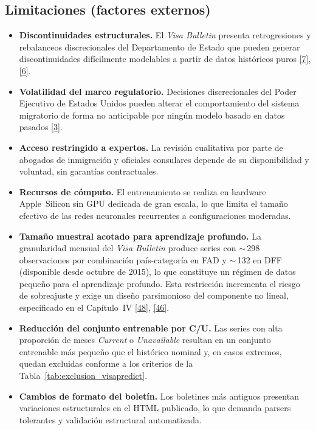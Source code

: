 \documentclass[12pt,letterpaper]{report}
\newcommand{\cita}[1]{\hyperref[bib:#1]{[#1]}}
\begin{document}
\subsection*{Limitaciones (factores externos)}

\begin{itemize}[leftmargin=1.4cm, itemsep=2pt, topsep=2pt]
    \item \textbf{Discontinuidades estructurales.} El \textit{Visa Bulletin} presenta retrogresiones y rebalanceos discrecionales del Departamento de Estado que pueden generar discontinuidades difícilmente modelables a partir de datos históricos puros \cita{7}, \cita{6}.
    \item \textbf{Volatilidad del marco regulatorio.} Decisiones discrecionales del Poder Ejecutivo de Estados Unidos pueden alterar el comportamiento del sistema migratorio de forma no anticipable por ningún modelo basado en datos pasados \cita{3}.
    \item \textbf{Acceso restringido a expertos.} La revisión cualitativa por parte de abogados de inmigración y oficiales consulares depende de su disponibilidad y voluntad, sin garantías contractuales.
    \item \textbf{Recursos de cómputo.} El entrenamiento se realiza en hardware Apple~Silicon sin GPU dedicada de gran escala, lo que limita el tamaño efectivo de las redes neuronales recurrentes a configuraciones moderadas.
    \item \textbf{Tamaño muestral acotado para aprendizaje profundo.} La granularidad mensual del \textit{Visa Bulletin} produce series con $\sim$\,298 observaciones por combinación país-categoría en FAD y $\sim$\,132 en DFF (disponible desde octubre de 2015), lo que constituye un régimen de datos pequeño para el aprendizaje profundo. Esta restricción incrementa el riesgo de sobreajuste y exige un diseño parsimonioso del componente no lineal, especificado en el Capítulo~IV \cita{48}, \cita{46}.
    \item \textbf{Reducción del conjunto entrenable por C/U.} Las series con alta proporción de meses \textit{Current} o \textit{Unavailable} resultan en un conjunto entrenable más pequeño que el histórico nominal y, en casos extremos, quedan excluidas conforme a los criterios de la Tabla~\ref{tab:exclusion_visapredict}.
    \item \textbf{Cambios de formato del boletín.} Los boletines más antiguos presentan variaciones estructurales en el HTML publicado, lo que demanda parsers tolerantes y validación estructural automatizada.
\end{itemize}
\end{document}
